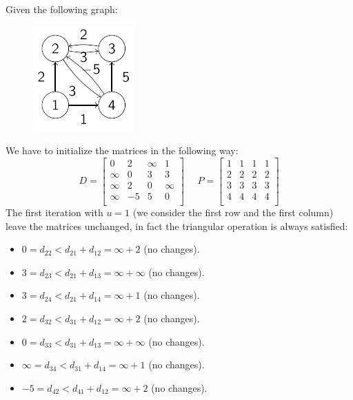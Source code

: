\documentclass[12pt, a4paper]{report}
\newtheorem[style=M,bodystyle=\normalfont]{proposition}{Proposition}
\newtheorem[style=M,bodystyle=\normalfont]{theorem}{Theorem}
\newtheorem[style=M,bodystyle=\normalfont]{corollary}{Corollary}
\newtheorem[style=M,bodystyle=\normalfont]{lemma}{Lemma}
\newtheorem[style=M,bodystyle=\normalfont]{definition}{Definition}
\begin{document}
    \begin{example}
        Given the following graph: 
        \begin{figure}[H]
            \centering
            \includegraphics[width=0.25\linewidth]{images/floyd.png}
        \end{figure}
        We have to initialize the matrices in the following way: 
        \[D=\begin{bmatrix}
            0 & 2 & \infty & 1 \\
            \infty & 0 & 3 & 3 \\
            \infty & 2 & 0 & \infty \\
            \infty & -5 & 5 & 0 \\
        \end{bmatrix}
        \:\:\:\:\:\:
        P=\begin{bmatrix}
            1 & 1 & 1 & 1 \\
            2 & 2 & 2 & 2 \\
            3 & 3 & 3 & 3 \\
            4 & 4 & 4 & 4 \\
        \end{bmatrix}
        \]
        The first iteration with $u=1$ (we consider the first row and the first column) leave the matrices unchanged, in fact the triangular operation is always satisfied: 
        \begin{itemize}
            \item $0=d_{22} < d_{21} + d_{12} = \infty + 2$ (no changes). 
            \item $3=d_{23} < d_{21} + d_{13} = \infty + \infty$ (no changes). 
            \item $3=d_{24} < d_{21} + d_{14} = \infty + 1$ (no changes). 
            \item $2=d_{32} < d_{31} + d_{12} = \infty + 2$ (no changes). 
            \item $0=d_{33} < d_{31} + d_{13} = \infty + \infty$ (no changes). 
            \item $\infty=d_{34} < d_{31} + d_{14} = \infty + 1$ (no changes). 
            \item $-5=d_{42} < d_{41} + d_{12} = \infty + 2$ (no changes). 

\end{itemize}
\end{example}
\end{document}
